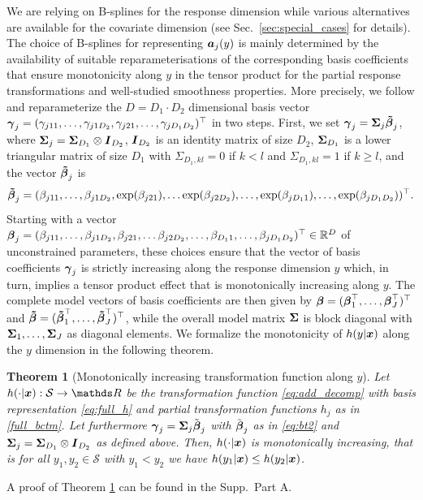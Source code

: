 \documentclass[12pt]{article}
\theoremstyle{plain}
\newtheorem{theorem}{Theorem}[section]
\begin{document}
We are relying on B-splines for the response dimension while various alternatives are available for the covariate dimension (see Sec.~\ref{sec:special_cases} for details). The choice of B-splines for representing $\text{\boldmath$a$}_j(y)$ is mainly determined by the availability of suitable reparameterisations of the corresponding basis coefficients that ensure monotonicity along $y$ in the tensor product for the partial response transformations and well-studied smoothness properties. More precisely, we follow \citet{pyawood} and reparameterize the $D=D_1\cdot D_2$ dimensional basis vector
$\text{\boldmath$\gamma$}_j=(\gamma_{j11},\ldots,\gamma_{j1D_2},\gamma_{j21},\ldots,\gamma_{jD_1D_2})^\top$ in two steps. First, we set $\text{\boldmath$\gamma$}_j= \mathbf{\Sigma}_j \text{\boldmath$\tilde \beta$}_j$, where  $\mathbf{\Sigma}_j = \mathbf{\Sigma}_{D_1} \otimes \text{\boldmath$I$}_{D_2}$, $\text{\boldmath$I$}_{D_2}$ is an identity matrix of size $D_2$, $\mathbf{\Sigma}_{D_1}$ is a lower triangular matrix of size $D_1$ with $\Sigma_{D_1,kl}=0$ if $k < l$ and $\Sigma_{D_1,kl} = 1$ if $k \geq l$, and the vector $\text{\boldmath$\tilde \beta$}_j$ is
\begin{align}\label{eq:bt2}
\text{\boldmath$\tilde \beta$}_j = (\beta_{j11}, \ldots, \beta_{j1D_2}, \exp(\beta_{j21}), \ldots \exp(\beta_{j2D_2}), \ldots ,\exp(\beta_{jD_1 1}),\ldots, \exp(\beta_{jD_1 D_2}))^\top.
\end{align}
Starting with a vector $\text{\boldmath$\beta$}_j=(\beta_{j11}, \ldots, \beta_{j1D_2}, \beta_{j21}, \ldots \beta_{j2D_2}, \ldots ,\beta_{D_1 1},\ldots, \beta_{jD_1 D_2})^\top\in\mathbb{R}^D$ of unconstrained parameters, these choices ensure that the vector of basis coefficients $\text{\boldmath$\gamma$}_j$ is strictly increasing along the response dimension $y$ which, in turn, implies a tensor product effect that is monotonically increasing along $y$. The complete model vectors of basis coefficients are then given by $\text{\boldmath$\beta$} = (\text{\boldmath$\beta$}_1^\top, \ldots, \text{\boldmath$\beta$}_J^\top)^\top$ and $\text{\boldmath$\tilde \beta$} =(\text{\boldmath$\tilde \beta$}_1^\top, \ldots, \text{\boldmath$\tilde \beta$}_J^\top)^\top$, while the overall model matrix $\mathbf{\Sigma}$ is block diagonal with $\mathbf{\Sigma}_1, \ldots, \mathbf{\Sigma}_J$ as diagonal elements. We formalize the monotonicity of $h(y|\text{\boldmath$x$})$ along the $y$ dimension in the following theorem. 
\begin{theorem}[Monotonically increasing transformation function along $y$]\label{theo1}
Let $h(\cdot|\xvec):\mathcal{S}\to\dsR$ be the transformation function \eqref{eq:add_decomp} with basis representation \eqref{eq:full_h}  and partial transformation functions $h_j$ as in \eqref{full_bctm}. Let furthermore $\text{\boldmath$\gamma$}_j=\mathbf{\Sigma}_j\tilde{\text{\boldmath$\beta$}}_j$ with $\tilde{\text{\boldmath$\beta$}}_j$ as in \eqref{eq:bt2} and  $\mathbf{\Sigma}_j = \mathbf{\Sigma}_{D_1} \otimes \text{\boldmath$I$}_{D_2}$ as defined above. Then,  $h(\cdot|\text{\boldmath$x$})$ is monotonically increasing, that is for all $y_1,y_2\in\mathcal{S}$ with $y_1<y_2$ we have $h(y_1|\text{\boldmath$x$})\leq h(y_2|\text{\boldmath$x$})$.
\end{theorem}
\noindent A proof of Theorem \ref{theo1} can be found in the Supp.~Part A.
\end{document}

